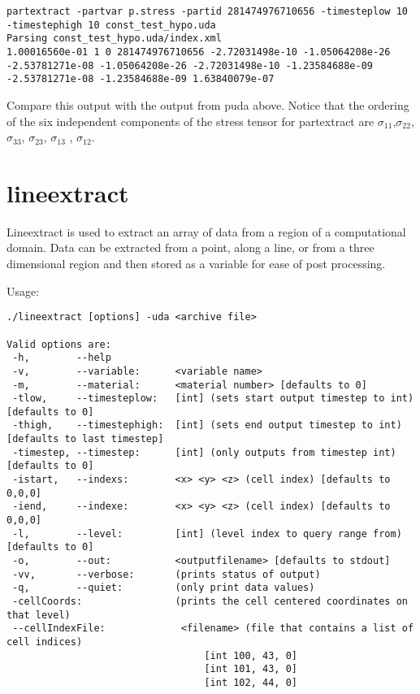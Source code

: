\begin{Verbatim}[fontsize=\footnotesize]
partextract -partvar p.stress -partid 281474976710656 -timesteplow 10 -timestephigh 10 const_test_hypo.uda
Parsing const_test_hypo.uda/index.xml
1.00016560e-01 1 0 281474976710656 -2.72031498e-10 -1.05064208e-26 -2.53781271e-08 -1.05064208e-26 -2.72031498e-10 -1.23584688e-09 -2.53781271e-08 -1.23584688e-09 1.63840079e-07
\end{Verbatim}

Compare this output with the output from puda above.  Notice that the
ordering of the six independent components of the stress tensor for
partextract are $\sigma_{11}$,$\sigma_{22}$, $\sigma_{33}$,
$\sigma_{23}$, $\sigma_{13}$ , $\sigma_{12}$.

\section{lineextract}

Lineextract is used to extract an array of data from a region of a
computational domain. Data can be extracted from a point, along a
line, or from a three dimensional region and then stored as a variable
for ease of post processing.

Usage: \begin{Verbatim}[fontsize=\footnotesize]
./lineextract [options] -uda <archive file>

Valid options are:
 -h,        --help
 -v,        --variable:      <variable name>
 -m,        --material:      <material number> [defaults to 0]
 -tlow,     --timesteplow:   [int] (sets start output timestep to int) [defaults to 0]
 -thigh,    --timestephigh:  [int] (sets end output timestep to int) [defaults to last timestep]
 -timestep, --timestep:      [int] (only outputs from timestep int) [defaults to 0]
 -istart,   --indexs:        <x> <y> <z> (cell index) [defaults to 0,0,0]
 -iend,     --indexe:        <x> <y> <z> (cell index) [defaults to 0,0,0]
 -l,        --level:         [int] (level index to query range from) [defaults to 0]
 -o,        --out:           <outputfilename> [defaults to stdout]
 -vv,       --verbose:       (prints status of output)
 -q,        --quiet:         (only print data values)
 -cellCoords:                (prints the cell centered coordinates on that level)
 --cellIndexFile:             <filename> (file that contains a list of cell indices)
                                  [int 100, 43, 0]
                                  [int 101, 43, 0]
                                  [int 102, 44, 0]
\end{Verbatim}


